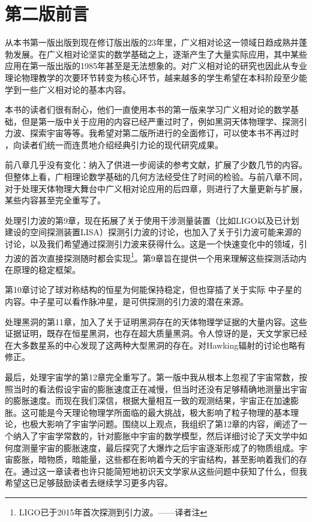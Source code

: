 
\chapter*{第二版前言}
从本书第一版出版到现在修订版出版的23年里，广义相对论这一领域日趋成熟并蓬勃发展。在广义相对论坚实的数学基础之上，逐渐产生了大量实际应用，其中某些应用在第一版出版的1985年甚至是无法想象的。对广义相对论的研究也因此从专业理论物理教学的次要环节转变为核心环节，越来越多的学生希望在本科阶段至少能学到一些广义相对论的基本内容。

本书的读者们很有耐心，他们一直使用本书的第一版来学习广义相对论的数学基础，但是第一版中关于应用的内容已经严重过时了，例如黑洞天体物理学、探测引力波、探索宇宙等等。我希望对第二版所进行的全面修订，可以使本书不再过时%
，向读者们统一而连贯地介绍经典引力论的现代研究成果。

前八章几乎没有变化：纳入了供进一步阅读的参考文献，扩展了少数几节的内容。但整体上看，广相理论数学基础的几何方法经受住了时间的检验。与前八章不同，对于处理天体物理大舞台中广义相对论应用的后四章，则进行了大量更新与扩展，某些内容甚至完全重写了。

处理引力波的第9章，现在拓展了关于使用干涉测量装置（比如LIGO以及已计划建设的空间探测装置LISA）探测引力波的讨论，也加入了关于引力波可能来源的讨论，以及我们希望通过探测引力波来获得什么。这是一个快速变化中的领域，引力波的首次直接探测随时都会实现\footnote{LIGO已于2015年首次探测到引力波。——译者注}。第9章旨在提供一个用来理解这些探测活动内在原理的稳定框架。

第10章讨论了球对称结构的恒星为何能保持稳定，但也穿插了关于实际%
中子星的内容。中子星可以看作脉冲星，是可供探测的引力波的潜在来源。

处理黑洞的第11章，加入了关于证明黑洞存在的天体物理学证据的大量内容。这些证据证明，既存在恒星黑洞，也存在超大质量黑洞。令人惊讶的是，天文学家已经在大多数星系的中心发现了这两种大型黑洞的存在。对Hawking辐射的讨论也略有修正。

最后，处理宇宙学的第12章完全重写了。第一版中我从根本上忽视了宇宙常数，按照当时的看法假设宇宙的膨胀速度正在减慢，但当时还没有足够精确地测量出宇宙的膨胀速度。而现在我们深信，根据大量相互一致的观测结果，宇宙正在加速膨胀。这可能是今天理论物理学所面临的最大挑战，极大影响了粒子物理的基本理论，也极大影响了宇宙学问题。围绕以上观点，我组织了第12章的内容，阐述了一个纳入了宇宙学常数的，针对膨胀中宇宙的数学模型，然后详细讨论了天文学中如何度测量宇宙的膨胀速度，最后探究了大爆炸之后宇宙逐渐形成了的物质组成。宇宙膨胀，暗物质，暗能量，这些都在影响着今天的宇宙结构，甚至影响着我们的存在。通过这一章读者也许只能简短地初识天文学家从这些问题中获知了什么，但我希望这已足够鼓励读者去继续学习更多内容。

